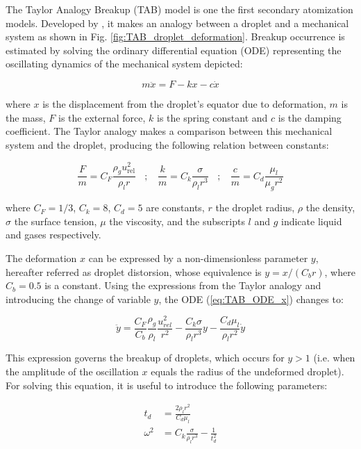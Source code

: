 The Taylor Analogy Breakup (TAB) model is one the first secondary atomization models. Developed by , it makes an analogy between a droplet and a mechanical system as shown in Fig. \ref{fig:TAB_droplet_deformation}. Breakup occurrence is estimated by solving the ordinary differential equation (ODE) representing the oscillating dynamics of the mechanical system depicted:

\begin{equation}
\label{eq:TAB_ODE_x}
m \ddot{x} = F - k x - c \dot{x}
\end{equation}

where $x$ is the displacement from the droplet's equator due to deformation, $m$ is the mass, $F$ is the external force, $k$ is the spring constant and $c$ is the damping coefficient. The Taylor analogy makes a comparison between this mechanical system and the droplet, producing the following relation between constants:

\begin{equation}
\frac{F}{m} = C_F \frac{\rho_g u_\mathrm{rel}^2}{\rho_l r} ~~~~ ; ~~~~ \frac{k}{m} = C_k \frac{\sigma}{\rho_l r^3} ~~~~ ; ~~~~ \frac{c}{m} = C_d \frac{\mu_l}{\mu_g r^2}
\end{equation}

where $C_F = 1/3$, $C_k = 8$, $C_d = 5$ are constants, $r$ the droplet radius, $\rho$ the density, $\sigma$ the surface tension, $\mu$ the viscosity, and the subscripts $l$ and $g$ indicate liquid and gases respectively. 

The deformation $x$ can be expressed by a non-dimensionless parameter $y$, hereafter referred as droplet distorsion, whose equivalence is $y = x / \left( C_b r \right)$, where $C_b = 0.5$ is a constant. Using the expressions from the Taylor analogy and introducing the change of variable $y$, the ODE (\ref{eq:TAB_ODE_x}) changes to:

\begin{equation}
\label{eq:TAB_ODE}
\ddot{y} = \frac{C_F}{C_b} \frac{\rho_g}{\rho_l} \frac{u_{rel}^2}{r^2} - \frac{C_k \sigma}{\rho_l r^3} y - \frac{C_d \mu_l}{\rho_l r^2} \dot{y}
\end{equation}

This expression governs the breakup of droplets, which occurs for $y > 1$ (i.e. when the amplitude of the oscillation $x$ equals the radius of the undeformed droplet). For solving this equation, it is useful to introduce the following parameters:

\begin{subequations}
\label{eq:TAB_td_omega_definition}
\begin{align}
t_d &= \frac{2 \rho_l r^2}{C_d \mu_l} \\
\omega^2 &= C_k \frac{\sigma}{\rho_l r^3} - \frac{1}{t_d^2}
\end{align}
\end{subequations}

